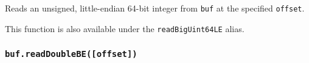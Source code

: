Reads an unsigned, little-endian 64-bit integer from \texttt{buf} at the
specified \texttt{offset}.

This function is also available under the \texttt{readBigUint64LE}
alias.

\begin{Shaded}
\begin{Highlighting}[]
\NormalTok{ \{ }\NormalTok{ \} } \OperatorTok{;}

\OperatorTok{=} \NormalTok{([}\OperatorTok{,} \OperatorTok{,} \OperatorTok{,} \OperatorTok{,} \OperatorTok{,} \OperatorTok{,} \OperatorTok{,} \NormalTok{])}\OperatorTok{;}

\NormalTok{(}\NormalTok{))}\OperatorTok{;}
\end{Highlighting}
\end{Shaded}

\begin{Shaded}
\begin{Highlighting}[]
\NormalTok{ \{ }\NormalTok{ \} }\OperatorTok{=} \NormalTok{(}\NormalTok{)}\OperatorTok{;}

\OperatorTok{=} \NormalTok{([}\OperatorTok{,} \OperatorTok{,} \OperatorTok{,} \OperatorTok{,} \OperatorTok{,} \OperatorTok{,} \OperatorTok{,} \NormalTok{])}\OperatorTok{;}

\NormalTok{(}\NormalTok{))}\OperatorTok{;}
\end{Highlighting}
\end{Shaded}

\subsubsection{\texorpdfstring{\texttt{buf.readDoubleBE({[}offset{]})}}{buf.readDoubleBE({[}offset{]})}}\label{buf.readdoublebeoffset}

